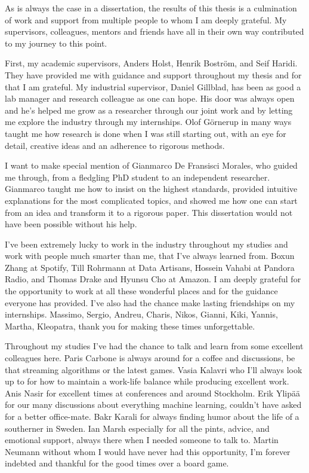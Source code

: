 \begin{acknowledgements}


As is always the case in a dissertation, the results of this thesis is
a culmination of work and support from multiple people to whom I am
deeply grateful. My supervisors, colleagues, mentors and friends have
all in their own way contributed to my journey to this point.

First, my academic supervisors, Anders Holst, Henrik Bostr\"{o}m, and Seif Haridi.
They have provided me with guidance and support throughout my thesis and for
that I am grateful.
My industrial supervisor, Daniel Gillblad, has been as good a lab manager and
research colleague as one can hope. His door was always open and he's helped me
grow as a researcher through our joint work and by letting me explore the industry through my
internships. Olof G\"{o}rnerup in many ways taught me how research is done when I
was still starting out, with an eye for detail, creative ideas and an adherence to rigorous
methods.

I want to make special mention of Gianmarco De Fransisci Morales, who
guided me through, from a fledgling PhD student to an independent researcher.
Gianmarco taught me how to insist on the highest standards, provided intuitive
explanations for the most complicated topics, and showed me how one can start
from an idea and transform it to a rigorous paper. This dissertation would
not have been possible without his help.

I've been extremely lucky to work in the industry throughout
my studies and work with people much smarter than me, that I've always learned
from. Boxun Zhang at Spotify, Till Rohrmann at Data Artisans, Hossein Vahabi
at Pandora Radio, and Thomas Drake and Hyunsu Cho at Amazon.
I am deeply grateful for the opportunity to work at all these wonderful
places and for the guidance everyone has provided. I've also had the
chance make lasting friendships on my internships. Massimo,
Sergio, Andreu, Charis, Nikos, Gianni, Kiki, Yannis, Martha, Kleopatra,
thank you for making these times unforgettable.

Throughout my studies I've had the chance to talk and learn from some
excellent colleagues here. Paris Carbone is always around
for a coffee and discussions, be that streaming algorithms or the latest
games. Vasia Kalavri who I'll always look up to for how to maintain
a work-life balance while producing excellent work.
Anis Nasir for excellent times at conferences and around Stockholm.
Erik Ylip\"{a}\"{a} for our many discussions about everything machine
learning, couldn't have asked for a better office-mate.
Bakr Karali for always finding humor about the life of a southerner
in Sweden. Ian Marsh especially for all the pints, advice, and
emotional support, always there when I needed someone to talk to.
Martin Neumann without whom I would have never had this opportunity,
I'm forever indebted and thankful for the good times over a board game.


\end{acknowledgements}
